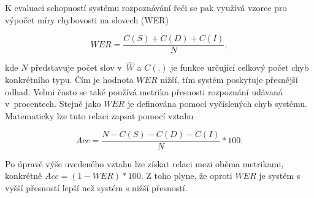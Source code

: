 \noindent K evaluaci schopností systému rozpoznávání řeči se pak využívá vzorce pro výpočet míry chybovosti na slovech (WER)

\begin{equation}
  WER = \frac{C(S) + C(D) + C(I)}{N},
  \label{eq:asr:decoding:wer}
\end{equation}

\noindent kde $N$ představuje počet slov v~$\hat{W}$ a $C(.)$ je funkce určující celkový počet chyb konkrétního typu. Čím je hodnota $WER$ nižší, tím systém poskytuje přesnější odhad. Velmi často se také používá metrika přesnosti rozpoznání udávaná v~procentech. Stejně jako $WER$ je definována pomocí vyčíslených chyb systému. Matematicky lze tuto relaci zapsat pomocí vztahu

\begin{equation}
  Acc = \frac{N - C(S) - C(D) - C(I)}{N} * 100.
  \label{eq:asr:decoding:acc}
\end{equation}

\noindent Po úpravě výše uvedeného vztahu lze získat relaci mezi oběma metrikami, konkrétně $Acc = \left(1 - WER\right) * 100$. Z toho plyne, že oproti $WER$ je systém s vyšší přesností lepší než systém s nižší přesností.

